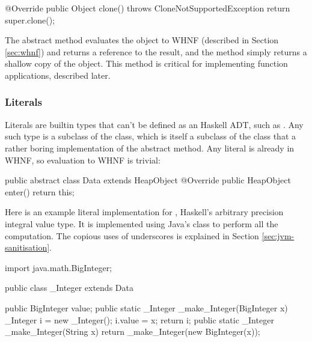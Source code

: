 \documentclass[dissertation.tex]{subfiles}
\begin{document}
{{\begin{javafigure}
{            @Override
            public Object clone() throws CloneNotSupportedException {
                return super.clone();
            }
        }
        \end{javafigure}

        The abstract  method evaluates the object to WHNF (described in Section \ref{sec:whnf}) and returns
        a reference to the result, and the  method simply returns a shallow copy of the object. This method
        is critical for implementing function applications, described later.

        \subsubsection{Literals}\label{sec:literals}
        {
            
            Literals are builtin types that can't be defined as an Haskell ADT, such as . Any such type
            is a subclass of the  class, which is itself a subclass of the  class that a
            rather boring implementation of the abstract  method. Any literal is already in WHNF, so
            evaluation to WHNF is trivial:

            \begin{javafigure}
            public abstract class Data extends HeapObject {
                @Override
                public HeapObject enter() {
                    return this;
                }
            }
            \end{javafigure}

            Here is an example literal implementation for , Haskell's arbitrary precision integral
            value type. It is implemented using Java's  class to perform all the computation. The
            copious uses of underscores is explained in Section \ref{sec:jvm-sanitisation}.

            \begin{javafigure}
            import java.math.BigInteger;

            public class _Integer extends Data {
                public BigInteger value;
                public static _Integer _make_Integer(BigInteger x) {
                    _Integer i = new _Integer();
                    i.value = x;
                    return i;
                }
                public static _Integer _make_Integer(String x) {
                    return _make_Integer(new BigInteger(x));
                }

}
\end{javafigure}}}}
\end{document}
